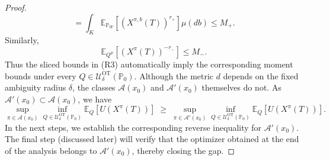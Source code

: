 \documentclass[11pt]{article}
\theoremstyle{definition}
\begin{document}
\begin{proof}
{\[=
\int_K \mathbb E_{\mathbb P_W}\!\left[(X^{\pi,b}(T))^{r_+}\right]\mu(db)
\le M_+. 
\]
Similarly, 
\[
\mathbb E_{{Q}^\mu}\!\left[(X^\pi(T))^{-r_-}\right]\le M_-.
\]
Thus the sliced bounds in (R3) automatically imply the corresponding moment bounds under
every ${Q}\in \mathcal{U}^{\text{OT}}_{\delta} (\mathbb P_0)$.}
{Although the metric \(d\) depends on the fixed ambiguity radius \(\delta\), the classes
\(\mathcal{A}(x_0)\) and \(\mathcal{A}'(x_0)\) themselves do not.}
As $\mathcal{A}'(x_0)\subset\mathcal{A}(x_0)$, we have 
$$
\sup_{\pi \in \mathcal{A}(x_0)} \inf_{{Q}\in\mathcal{U}^{\text{OT}}_{\delta}(\mathbb{P}_0)} \mathbb{E}_{Q}[U(X^\pi(T))]
\;\ge\; \sup_{\pi \in \mathcal{A}'(x_0)} \inf_{{Q}\in\mathcal{U}^{\text{OT}}_{\delta}(\mathbb{P}_0)} \mathbb{E}_{Q}[U(X^\pi(T))].
$$
In the next steps, we establish the corresponding reverse inequality for $\mathcal{A}'(x_0)$. The final step (discussed later) will verify that the optimizer obtained at the end of the analysis belongs to $\mathcal{A}'(x_0)$, thereby closing the gap.


\end{proof}
\end{document}
